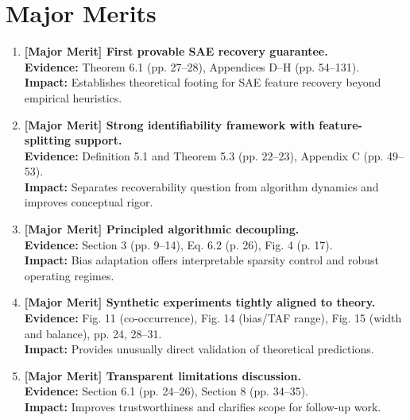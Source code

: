 \documentclass[11pt,a4paper]{article}
\begin{document}
\section{Major Merits}
\begin{enumerate}[leftmargin=*]
\item \textbf{[Major Merit] First provable SAE recovery guarantee.}\\
\textbf{Evidence:} Theorem 6.1 (pp. 27--28), Appendices D--H (pp. 54--131).\\
\textbf{Impact:} Establishes theoretical footing for SAE feature recovery beyond empirical heuristics.

\item \textbf{[Major Merit] Strong identifiability framework with feature-splitting support.}\\
\textbf{Evidence:} Definition 5.1 and Theorem 5.3 (pp. 22--23), Appendix C (pp. 49--53).\\
\textbf{Impact:} Separates recoverability question from algorithm dynamics and improves conceptual rigor.

\item \textbf{[Major Merit] Principled algorithmic decoupling.}\\
\textbf{Evidence:} Section 3 (pp. 9--14), Eq. 6.2 (p. 26), Fig. 4 (p. 17).\\
\textbf{Impact:} Bias adaptation offers interpretable sparsity control and robust operating regimes.

\item \textbf{[Major Merit] Synthetic experiments tightly aligned to theory.}\\
\textbf{Evidence:} Fig. 11 (co-occurrence), Fig. 14 (bias/TAF range), Fig. 15 (width and balance), pp. 24, 28--31.\\
\textbf{Impact:} Provides unusually direct validation of theoretical predictions.

\item \textbf{[Major Merit] Transparent limitations discussion.}\\
\textbf{Evidence:} Section 6.1 (pp. 24--26), Section 8 (pp. 34--35).\\
\textbf{Impact:} Improves trustworthiness and clarifies scope for follow-up work.
\end{enumerate}
\end{document}
